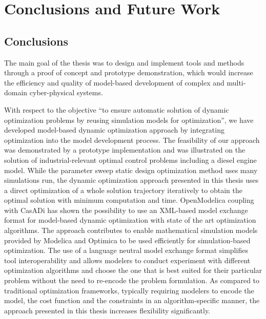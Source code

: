 
\chapter{Conclusions and Future Work}
\label{cha:conclusionsandfuturework}

\section{Conclusions}
\label{sec:conclusions}

The main goal of the thesis was to design and implement tools and methods through a proof of concept and prototype demonstration, which would increase the efficiency and quality of model-based development of complex and multi-domain cyber-physical systems.

With respect to the objective “to ensure automatic solution of dynamic optimization problems by reusing simulation models for optimization”, we have developed model-based dynamic optimization approach by integrating optimization into the model development process. The feasibility of our approach was demonstrated by a prototype implementation and was illustrated on the solution of industrial-relevant optimal control problems including a diesel engine model. While the parameter sweep static design optimization method uses many simulations run, the dynamic optimization approach presented in this thesis uses a direct optimization of a whole solution trajectory iteratively to obtain the optimal solution with minimum computation and time. OpenModelica coupling with CasADi has shown the possibility to use an XML-based model exchange format for model-based dynamic optimization with state of the art optimization algorithms. The approach contributes to enable mathematical simulation models provided by Modelica and Optimica to be used efficiently for simulation-based optimization. The use of a language neutral model exchange format simplifies tool interoperability and allows modelers to conduct experiment with different optimization algorithms and choose the one that is best suited for their particular problem without the need to re-encode the problem formulation. As compared to traditional optimization frameworks, typically requiring modelers to encode the model, the cost function and the constraints in an algorithm-specific manner, the approach presented in this thesis increases flexibility significantly.    

